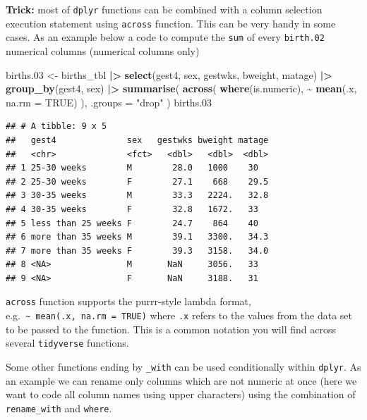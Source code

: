 \documentclass[
]{book}
\newenvironment{Shaded}{\begin{snugshade}}{\end{snugshade}}
\newcommand{\AttributeTok}[1]{\textcolor[rgb]{0.13,0.29,0.53}{#1}}
\newcommand{\ConstantTok}[1]{\textcolor[rgb]{0.56,0.35,0.01}{#1}}
\newcommand{\FloatTok}[1]{\textcolor[rgb]{0.00,0.00,0.81}{#1}}
\newcommand{\FunctionTok}[1]{\textcolor[rgb]{0.13,0.29,0.53}{\textbf{#1}}}
\newcommand{\NormalTok}[1]{#1}
\newcommand{\OtherTok}[1]{\textcolor[rgb]{0.56,0.35,0.01}{#1}}
\newcommand{\SpecialCharTok}[1]{\textcolor[rgb]{0.81,0.36,0.00}{\textbf{#1}}}
\newcommand{\StringTok}[1]{\textcolor[rgb]{0.31,0.60,0.02}{#1}}
\theoremstyle{definition}
\theoremstyle{definition}
\theoremstyle{definition}
\theoremstyle{definition}
\theoremstyle{remark}
\begin{document}
\textbf{Trick:} most of \texttt{dplyr} functions can be combined with a column selection execution statement using
\texttt{across} function. This can be very handy in some cases.
As an example below a code to compute the \texttt{sum} of every \texttt{birth.02} numerical columns (numerical columns only)

\begin{Shaded}
\begin{Highlighting}[]
\NormalTok{births}\FloatTok{.03} \OtherTok{\textless{}{-}}
\NormalTok{  births\_tbl }\SpecialCharTok{|\textgreater{}}
  \FunctionTok{select}\NormalTok{(gest4, sex, gestwks, bweight, matage) }\SpecialCharTok{|\textgreater{}}
  \FunctionTok{group\_by}\NormalTok{(gest4, sex) }\SpecialCharTok{|\textgreater{}}
  \FunctionTok{summarise}\NormalTok{(}
    \FunctionTok{across}\NormalTok{(}
      \FunctionTok{where}\NormalTok{(is.numeric),}
      \SpecialCharTok{\textasciitilde{}} \FunctionTok{mean}\NormalTok{(.x, }\AttributeTok{na.rm =} \ConstantTok{TRUE}\NormalTok{)}
\NormalTok{    ),}
    \AttributeTok{.groups =} \StringTok{"drop"}
\NormalTok{  )}
\NormalTok{births}\FloatTok{.03}
\end{Highlighting}
\end{Shaded}

\begin{verbatim}
## # A tibble: 9 x 5
##   gest4              sex   gestwks bweight matage
##   <chr>              <fct>   <dbl>   <dbl>  <dbl>
## 1 25-30 weeks        M        28.0   1000    30  
## 2 25-30 weeks        F        27.1    668    29.5
## 3 30-35 weeks        M        33.3   2224.   32.8
## 4 30-35 weeks        F        32.8   1672.   33  
## 5 less than 25 weeks F        24.7    864    40  
## 6 more than 35 weeks M        39.1   3300.   34.3
## 7 more than 35 weeks F        39.3   3158.   34.0
## 8 <NA>               M       NaN     3056.   33  
## 9 <NA>               F       NaN     3188.   31
\end{verbatim}

\texttt{across} function supports the purrr-style lambda format, e.g.~\texttt{\textasciitilde{}\ mean(.x,\ na.rm\ =\ TRUE)}
where \texttt{.x} refers to the values from the data set to be passed to the function. This is a common notation you will find across several \texttt{tidyverse} functions.

Some other functions ending by \texttt{\_with} can be used conditionally within \texttt{dplyr}.
As an example we can rename only columns which are not numeric at once (here we want to code all column names using upper characters) using
the combination of \texttt{rename\_with} and \texttt{where}.
\end{document}
